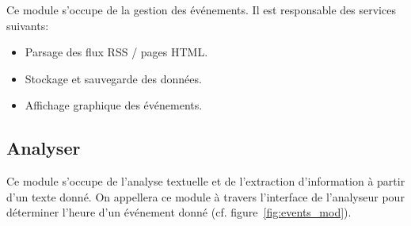 Ce module s'occupe de la gestion des événements. Il est responsable des services suivants:
\begin{itemize}
\renewcommand{\labelitemi}{$\bullet$}
\item Parsage des flux RSS / pages HTML.
\item Stockage et sauvegarde des données.
\item Affichage graphique des événements.
\end{itemize}


\subsection{Analyser}
Ce module s'occupe de l'analyse textuelle et de l'extraction d'information à partir d'un texte donné. On appellera ce module à travers l'interface de l'analyseur pour déterminer l'heure d'un événement donné (cf. figure~\ref{fig:events_mod}).